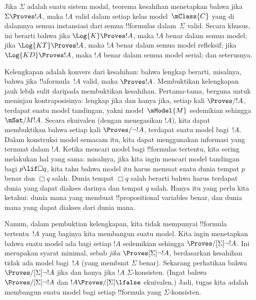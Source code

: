 \documentclass[../../../include/open-logic-section]{subfiles}
\begin{document}


Jika $\Sigma$ adalah suatu sistem modal, teorema kesahihan menetapkan bahwa
jika $\Sigma \Proves !A$, maka $!A$ valid dalam setiap kelas
model~$\mClass{C}$ yang di dalamnya semua instansiasi dari semua !!{formula}s
dalam~$\Sigma$ valid. Secara khusus, ini berarti bahwa jika $\Log{K}
\Proves !A$, maka $!A$ benar dalam semua model; jika $\Log{KT} \Proves !A$,
maka $!A$ benar dalam semua model refleksif; jika $\Log{KD} \Proves !A$,
maka $!A$ benar dalam semua model serial; dan seterusnya.

Kelengkapan adalah konvers dari kesahihan: bahwa  lengkap berarti,
misalnya, bahwa jika !!a{formula}~$!A$ valid, maka $\Proves !A$.
Membuktikan kelengkapan jauh lebih sulit daripada membuktikan kesahihan.
Pertama-tama, berguna untuk meninjau kontraposisinya:  lengkap jika
dan hanya jika, setiap kali $\Proves/ !A$, terdapat suatu model tandingan,
yakni model~$\mModel{M}$ sedemikian sehingga $\mSat/{M}{!A}$. Secara
ekuivalen (dengan menegasikan $!A$), kita dapat membuktikan bahwa setiap kali
$\Proves/ \lnot !A$, terdapat suatu model bagi~$!A$. Dalam konstruksi model
semacam itu, kita dapat menggunakan informasi yang termuat dalam $!A$. Ketika
mencari model bagi !!{formula}s tertentu, kita sering melakukan hal yang sama:
misalnya, jika kita ingin mencari model tandingan bagi $p \lif \Box q$, kita
tahu bahwa model itu harus memuat suatu dunia tempat $p$ benar dan $\Box q$
salah. Dunia tempat $\Box q$ salah berarti bahwa harus terdapat dunia yang
dapat diakses darinya dan tempat $q$ salah. Hanya itu yang perlu kita ketahui:
dunia mana yang membuat !!{propositional variable}s benar, dan dunia mana yang
dapat diakses dari dunia mana.

Namun, dalam pembuktian kelengkapan, kita tidak mempunyai !!{formula}
tertentu~$!A$ yang baginya kita membangun suatu model. Kita ingin menetapkan
bahwa suatu model ada bagi setiap $!A$ sedemikian sehingga
$\Proves/[\Sigma] \lnot !A$. Ini merupakan syarat minimal, sebab
\emph{jika} $\Proves[\Sigma] \lnot !A$, berdasarkan kesahihan tidak ada model
bagi~$!A$ (yang membuat $\Sigma$ benar). Sekarang perhatikan bahwa
$\Proves/[\Sigma] \lnot !A$ jika dan hanya jika $!A$ $\Sigma$-konsisten.
(Ingat bahwa $\Proves/[\Sigma] \lnot !A$ dan
$!A \Proves/[\Sigma] \lfalse$ ekuivalen.) Jadi, tugas kita adalah membangun
suatu model bagi setiap !!{formula} yang $\Sigma$-konsisten.
\end{document}
